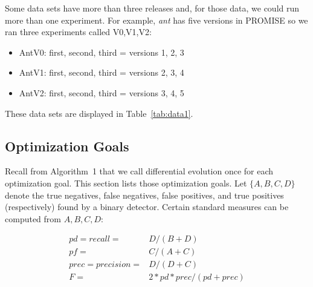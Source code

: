 \documentclass[smallextended]{svjour3}
\newcommand{\bi}{\begin{itemize}[leftmargin=0.4cm]}
\newcommand{\ei}{\end{itemize}}
\newcommand{\tion}[1]{\S\ref{sect:#1}}
\newcommand{\tab}[1]{Table~\ref{tab:#1}}
\begin{document}

Some data sets have more than three releases and, for those data, we could run more
 than one experiment. For example, {\em ant} has five versions in PROMISE so
 we ran three experiments called V0,V1,V2:
 \bi
 \item AntV0: first, second, third = versions 1, 2, 3
 \item AntV1: first, second, third = versions 2, 3, 4
 \item AntV2: first, second, third = versions 3, 4, 5
 \ei 
These data sets are displayed in \tab{data1}.





\subsection{Optimization Goals}

Recall from Algorithm~1 that we call differential evolution once for each
 optimization goal. This section lists those optimization goals.
Let $\{A,B,C,D\}$ denote the
true negatives, 
false negatives, 
false positives, and 
true positives
(respectively) found by a binary detector. 
Certain standard measures can be computed from
$A,B,C,D$: 

{\scriptsize\[
\begin{array}{ll}
pd=recall=&D/(B+D)\\
pf=&C/(A+C)\\ 
prec=precision=&D/(D+C) \\
F =&2*pd*prec/(pd + prec)
\end{array}
\]}
\end{document}

